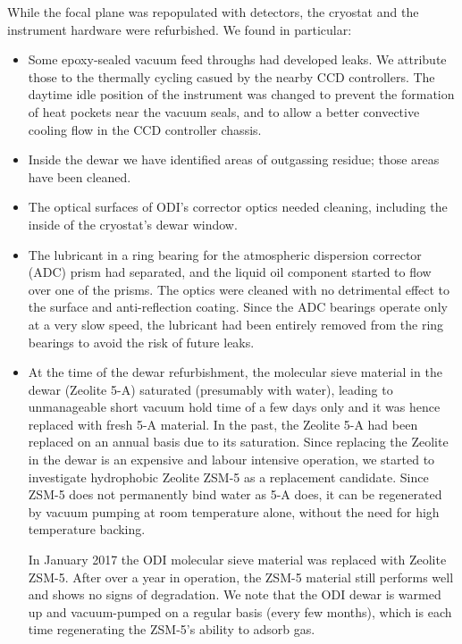 \documentclass[]{spieman}
\begin{document}
While the focal plane was repopulated with detectors, the cryostat and the 
instrument hardware were refurbished. We found in particular:
\begin{itemize}
	\item Some epoxy-sealed vacuum feed throughs had developed  leaks. We 
	attribute those to the thermally cycling casued by the nearby CCD controllers. 
	The daytime idle position of the instrument was changed to prevent the 
	formation of heat pockets near the vacuum seals, and to allow a better
	convective cooling flow in the CCD controller chassis.
	
	\item Inside the dewar we have identified areas of outgassing residue; 
	those areas have been cleaned. 
	
	\item The optical surfaces of ODI's corrector optics needed cleaning,
	 including the inside of the cryostat's dewar window. 
	
	\item The lubricant in a ring bearing for the atmospheric dispersion 
	corrector (ADC) prism had separated, and the liquid oil component started to 
	flow over one of the prisms. The optics were cleaned with no detrimental effect 
	to the surface and anti-reflection coating. Since the ADC bearings operate 
	only at a very slow speed, the lubricant had been entirely removed from the 
	ring bearings to avoid the risk of future leaks. 
	

\item  At the time of the dewar refurbishment, the molecular sieve material in
the dewar (Zeolite 5-A) saturated (presumably with water), leading
to unmanageable short vacuum hold time of a few days only and it was hence 
replaced with fresh 5-A material. In the past, the Zeolite 5-A had been
replaced on an annual basis due to its saturation. Since replacing the Zeolite
in the dewar is an expensive and labour intensive operation, we started to
investigate hydrophobic Zeolite ZSM-5 as a replacement candidate. Since ZSM-5
does not permanently bind water as 5-A does, it can be regenerated by vacuum
pumping at room temperature alone, without the need for high temperature backing.

In January 2017 the ODI molecular sieve material was replaced with Zeolite ZSM-5.
After over a year in operation, the ZSM-5 material still performs well and shows
no signs of degradation. We note that the ODI dewar is warmed up and vacuum-pumped
on a regular basis (every few months), which is each time regenerating the ZSM-5's
ability to adsorb gas.

\end{itemize}
\end{document}
